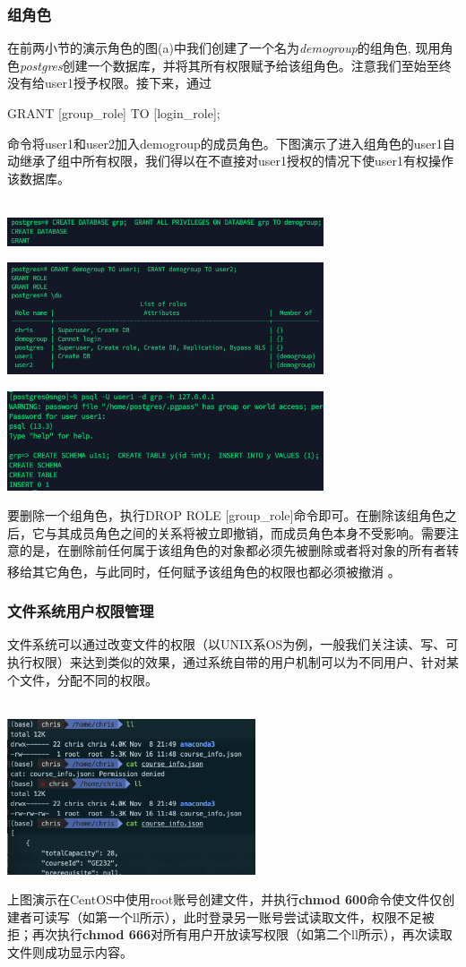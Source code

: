 \subsubsection{组角色}
在前两小节的演示角色的图(a)中我们创建了一个名为\emph{demogroup}的组角色, 现用角色\textit{postgres}创建一个数据库，并将其所有权限赋予给该组角色。注意我们至始至终没有给user1授予权限。接下来，通过\\
\centerline{GRANT [group\_role] TO [login\_role];}
命令将user1和user2加入demogroup的成员角色。下图演示了进入组角色的user1自动继承了组中所有权限，我们得以在不直接对user1授权的情况下使user1有权操作该数据库。\\~\\
\centerline{\includegraphics[width=0.7\textwidth]{./pic/grp.png}}
\centerline{\includegraphics[width=0.7\textwidth]{./pic/grgrp.png}}
\centerline{\includegraphics[width=0.7\textwidth]{./pic/grgrp2.png}}
\par 要删除一个组角色，执行DROP ROLE [group\_role]命令即可。在删除该组角色之后，它与其成员角色之间的关系将被立即撤销，而成员角色本身不受影响。需要注意的是，在删除前任何属于该组角色的对象都必须先被删除或者将对象的所有者转移给其它角色，与此同时，任何赋予该组角色的权限也都必须被撤消\textsuperscript{\cite{turing-2021}} 。
\subsubsection{文件系统用户权限管理}
文件系统可以通过改变文件的权限（以UNIX系OS为例，一般我们关注读、写、可执行权限）来达到类似的效果，通过系统自带的用户机制可以为不同用户、针对某个文件，分配不同的权限。\\~\\
\centerline{\includegraphics[width=0.55\textwidth]{pic/fsp}}
\par 上图演示在CentOS中使用root账号创建文件，并执行\textbf{chmod 600}命令使文件仅创建者可读写（如第一个ll所示），此时登录另一账号尝试读取文件，权限不足被拒；再次执行\textbf{chmod 666}对所有用户开放读写权限（如第二个ll所示），再次读取文件则成功显示内容。